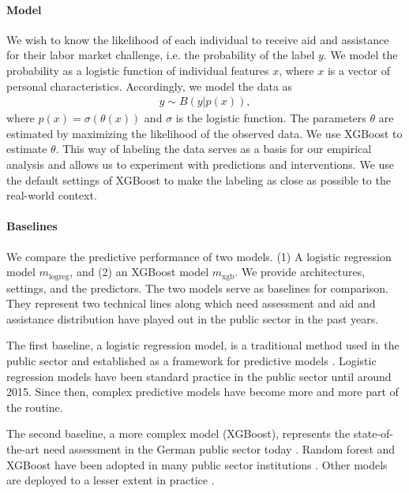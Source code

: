 \documentclass{article} %
\begin{document}
\paragraph{Model}
We wish to know the likelihood of each individual to receive aid and assistance for their labor market challenge, i.e. the probability of the label $y$. We model the probability as a logistic function of individual features $x$, where $x$ is a vector of personal characteristics. Accordingly, we model the data as
\begin{align*}
y\sim B(y|p(x)),
\end{align*}
where $p(x)=\sigma(\theta(x))$ and $\sigma$ is the logistic function. The parameters $\theta$ are estimated by maximizing the likelihood of the observed data. We use XGBoost to estimate $\theta$. This way of labeling the data serves as a basis for our empirical analysis and allows us to experiment with predictions and interventions. We use the default settings of XGBoost to make the labeling as close as possible to the real-world context.

\paragraph{Baselines}

We compare the predictive performance of two models. (1) A logistic regression model $m_{\mathrm{logreg}}$, and (2) an XGBoost model $m_{\mathrm{xgb}}$. We provide architectures, settings, and the predictors. The two models serve as baselines for comparison. They represent two technical lines along which need assessment and aid and assistance distribution have played out in the public sector in the past years.

The first baseline, a logistic regression model, is a traditional method used in the public sector and established as a framework for predictive models \cite{desiereUsingArtificialIntelligence2021,kortner2023predictive,loxha2014profiling}. Logistic regression models have been standard practice in the public sector until around 2015. Since then, complex predictive models have become more and more part of the routine.

The second baseline, a more complex model (XGBoost), represents the state-of-the-art need assessment in the German public sector today \cite{Bach_Kern_Mautner_Kreuter_2023, sun2019mapping, wirtz2019artificial}. Random forest and XGBoost have been adopted in many public sector institutions \cite{kortner2023predictive}. Other models are deployed to a lesser extent in practice \cite{Bach_Kern_Mautner_Kreuter_2023}.
\end{document}
